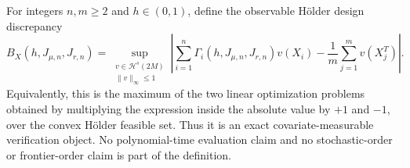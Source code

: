 For integers \(n,m\ge2\) and \(h\in(0,1)\), define the observable H\"older design discrepancy
\[
B_X(h,J_{\mu,n},J_{r,n})=
\sup_{\substack{v\in\mathcal H^s(2M)\\ \|v\|_\infty\le1}}
\left|\sum_{i=1}^n\Gamma_i(h,J_{\mu,n},J_{r,n})v(X_i)-\frac1m\sum_{j=1}^mv(X_j^T)\right|.
\]
Equivalently, this is the maximum of the two linear optimization problems obtained by multiplying the expression inside the absolute value by \(+1\) and \(-1\), over the convex H\"older feasible set. Thus it is an exact covariate-measurable verification object. No polynomial-time evaluation claim and no stochastic-order or frontier-order claim is part of the definition.
